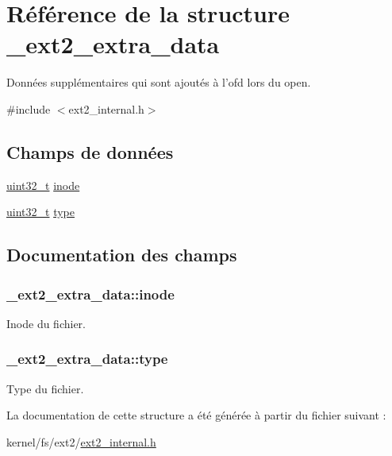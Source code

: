 \hypertarget{struct__ext2__extra__data}{\section{Référence de la structure \-\_\-ext2\-\_\-extra\-\_\-data}
\label{struct__ext2__extra__data}
}


Données supplémentaires qui sont ajoutés à l'ofd lors du open.  




{\ttfamily \#include $<$ext2\-\_\-internal.\-h$>$}

\subsection*{Champs de données}
\begin{DoxyCompactItemize}
\item 
\hyperlink{kernel_2include_2types_8h_a33594304e786b158f3fb30289278f5af}{uint32\-\_\-t} \hyperlink{struct__ext2__extra__data_a67635cdfceeb4475b1410ec3bc8ae552}{inode}
\item 
\hyperlink{kernel_2include_2types_8h_a33594304e786b158f3fb30289278f5af}{uint32\-\_\-t} \hyperlink{struct__ext2__extra__data_a607854c0e8d75ee5be59b7e67eb2a00c}{type}
\end{DoxyCompactItemize}


\subsection{Documentation des champs}
\hypertarget{struct__ext2__extra__data_a67635cdfceeb4475b1410ec3bc8ae552}{
\subsubsection[{inode}]{ \-\_\-ext2\-\_\-extra\-\_\-data\-::inode}}\label{struct__ext2__extra__data_a67635cdfceeb4475b1410ec3bc8ae552}
Inode du fichier. \hypertarget{struct__ext2__extra__data_a607854c0e8d75ee5be59b7e67eb2a00c}{
\subsubsection[{type}]{ \-\_\-ext2\-\_\-extra\-\_\-data\-::type}}\label{struct__ext2__extra__data_a607854c0e8d75ee5be59b7e67eb2a00c}
Type du fichier. 

La documentation de cette structure a été générée à partir du fichier suivant \-:\begin{DoxyCompactItemize}
\item 
kernel/fs/ext2/\hyperlink{ext2__internal_8h}{ext2\-\_\-internal.\-h}\end{DoxyCompactItemize}
